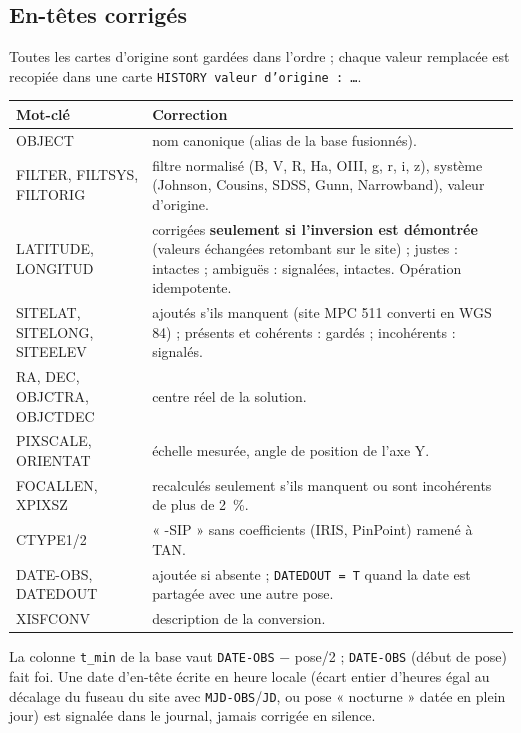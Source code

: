 \subsection{En-têtes corrigés}\label{sec:entetes}
Toutes les cartes d'origine sont gardées dans l'ordre ; chaque valeur remplacée est recopiée dans une carte
\texttt{HISTORY valeur d'origine : …}.
\begin{center}\small
\begin{tabularx}{\linewidth}{@{}>{\ttfamily}lX@{}}
\toprule
\normalfont\textbf{Mot-clé} & \textbf{Correction}\\
\midrule
OBJECT & nom canonique (alias de la base fusionnés).\\
FILTER, FILTSYS, FILTORIG & filtre normalisé (B, V, R, Ha, OIII, g, r, i, z), système (Johnson, Cousins, SDSS, Gunn, Narrowband), valeur d'origine.\\
LATITUDE, LONGITUD & corrigées \textbf{seulement si l'inversion est démontrée} (valeurs échangées retombant sur le site) ; justes : intactes ; ambiguës : signalées, intactes. Opération idempotente.\\
SITELAT, SITELONG, SITEELEV & ajoutés s'ils manquent (site MPC 511 converti en WGS 84) ; présents et cohérents : gardés ; incohérents : signalés.\\
RA, DEC, OBJCTRA, OBJCTDEC & centre réel de la solution.\\
PIXSCALE, ORIENTAT & échelle mesurée, angle de position de l'axe Y.\\
FOCALLEN, XPIXSZ & recalculés seulement s'ils manquent ou sont incohérents de plus de 2~\%.\\
CTYPE1/2 & « -SIP » sans coefficients (IRIS, PinPoint) ramené à TAN.\\
DATE-OBS, DATEDOUT & ajoutée si absente ; \texttt{DATEDOUT = T} quand la date est partagée avec une autre pose.\\
XISFCONV & description de la conversion.\\
\bottomrule
\end{tabularx}
\end{center}
La colonne \texttt{t\_min} de la base vaut \texttt{DATE-OBS} − pose/2 ; \texttt{DATE-OBS} (début de pose) fait foi.
Une date d'en-tête écrite en heure locale (écart entier d'heures égal au décalage du fuseau du site avec
\texttt{MJD-OBS}/\texttt{JD}, ou pose « nocturne » datée en plein jour) est signalée dans le journal, jamais
corrigée en silence.

